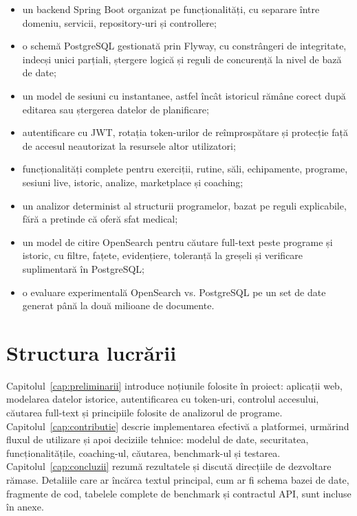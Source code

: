 \begin{itemize}
  \item un backend Spring Boot organizat pe funcționalități, cu separare între domeniu, servicii,
        repository-uri și controllere;
  \item o schemă PostgreSQL gestionată prin Flyway, cu constrângeri de integritate, indecși unici
        parțiali, ștergere logică și reguli de concurență la nivel de bază de date;
  \item un model de sesiuni cu instantanee, astfel încât istoricul rămâne corect după editarea sau
        ștergerea datelor de planificare;
  \item autentificare cu JWT, rotația token-urilor de reîmprospătare și protecție față de accesul
        neautorizat la resursele altor utilizatori;
  \item funcționalități complete pentru exerciții, rutine, săli, echipamente, programe, sesiuni live,
        istoric, analize, marketplace și coaching;
  \item un analizor determinist al structurii programelor, bazat pe reguli explicabile, fără a pretinde
        că oferă sfat medical;
  \item un model de citire OpenSearch pentru căutare full-text peste programe și istoric, cu filtre,
        fațete, evidențiere, toleranță la greșeli și verificare suplimentară în PostgreSQL;
  \item o evaluare experimentală OpenSearch vs. PostgreSQL pe un set de date generat până la două
        milioane de documente.
\end{itemize}

\section{Structura lucrării}

Capitolul~\ref{cap:preliminarii} introduce noțiunile folosite în proiect: aplicații web, modelarea
datelor istorice, autentificarea cu token-uri, controlul accesului, căutarea full-text și principiile
folosite de analizorul de programe. Capitolul~\ref{cap:contributie} descrie implementarea efectivă a
platformei, urmărind fluxul de utilizare și apoi deciziile tehnice: modelul de date, securitatea,
funcționalitățile, coaching-ul, căutarea, benchmark-ul și testarea. Capitolul~\ref{cap:concluzii}
rezumă rezultatele și discută direcțiile de dezvoltare rămase. Detaliile care ar încărca textul
principal, cum ar fi schema bazei de date, fragmente de cod, tabelele complete de benchmark și
contractul API, sunt incluse în anexe.
